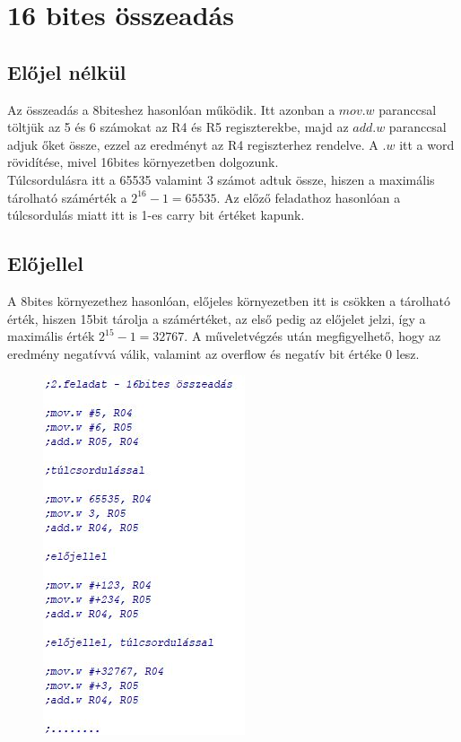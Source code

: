 \documentclass[10pt, conference,a4paper]{ITKproc}
\begin{document}
\section{16 bites összeadás}
\subsection{Előjel nélkül}
Az összeadás a 8biteshez hasonlóan működik. Itt azonban a $mov.w$ paranccsal töltjük az 5 és 6 számokat az R4 és R5 regiszterekbe, majd az $add.w$ paranccsal adjuk őket össze, ezzel az eredményt az R4 regiszterhez rendelve. A $.w$ itt a word rövidítése, mivel 16bites környezetben dolgozunk. 
\\
Túlcsordulásra itt a 65535 valamint 3 számot adtuk össze, hiszen a maximális tárolható számérték a $2^16 - 1 = 65535$. Az előző feladathoz hasonlóan a túlcsordulás miatt itt is 1-es carry bit értéket kapunk. 
\subsection{Előjellel}
A 8bites környezethez hasonlóan, előjeles környezetben itt is csökken a tárolható érték, hiszen 15bit tárolja a számértéket, az első pedig az előjelet jelzi, így a maximális érték $2^15 - 1 =32767$. A műveletvégzés után megfigyelhető, hogy az eredmény negatívvá válik, valamint az overflow és negatív bit értéke 0 lesz. 

\begin{figure}[h]
\includegraphics[scale=0.5]{2feladat}
\centering

\end{figure}
\end{document}
